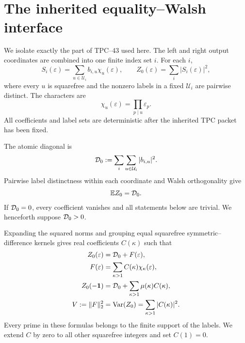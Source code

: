 \section{The inherited equality--Walsh interface}
\label{sec:tpc44-interface}

We isolate exactly the part of TPC--43 used here.  The left and right
output coordinates are combined into one finite index set \(i\).  For
each \(i\),
\begin{equation}
 S_i(\varepsilon)=\sum_{u\in\mathcal U_i}b_{i,u}\chi_u(\varepsilon),
 \qquad
 Z_0(\varepsilon)=\sum_i|S_i(\varepsilon)|^2,
 \label{eq:tpc44-coordinate-packet}
\end{equation}
where every \(u\) is squarefree and the nonzero labels in a fixed
\(\mathcal U_i\) are pairwise distinct.  The characters are
\begin{equation}
 \chi_u(\varepsilon)=\prod_{p\mid u}\varepsilon_p.
 \label{eq:tpc44-character}
\end{equation}
All coefficients and label sets are deterministic after the inherited
TPC packet has been fixed.

The atomic diagonal is
\begin{equation}
 \mathcal D_0:=\sum_i\sum_{u\in\mathcal U_i}|b_{i,u}|^2.
 \label{eq:tpc44-diagonal}
\end{equation}
Pairwise label distinctness within each coordinate and Walsh
orthogonality give
\begin{equation}
 \mathbb E Z_0=\mathcal D_0.
 \label{eq:tpc44-mean-diagonal}
\end{equation}
If \(\mathcal D_0=0\), every coefficient vanishes and all statements below are
trivial.  We henceforth suppose \(\mathcal D_0>0\).

Expanding the squared norms and grouping equal squarefree
symmetric--difference kernels gives real coefficients \(C(\kappa)\)
such that
\begin{align}
 Z_0(\varepsilon)
 &=\mathcal D_0+F(\varepsilon),
 \label{eq:tpc44-Z-F}\\
 F(\varepsilon)
 &=\sum_{\kappa>1}C(\kappa)\chi_\kappa(\varepsilon),
 \label{eq:tpc44-F-spectrum}\\
 Z_0(-\mathbf 1)
 &=\mathcal D_0+\sum_{\kappa>1}\mu(\kappa)C(\kappa),
 \label{eq:tpc44-physical-corner}\\
 V:=\|F\|_2^2
 &=\operatorname{Var}(Z_0)
 =\sum_{\kappa>1}|C(\kappa)|^2.
 \label{eq:tpc44-variance-parseval}
\end{align}
Every prime in these formulas belongs to the finite support of the
labels.  We extend \(C\) by zero to all other squarefree integers and set
\(C(1)=0\).

